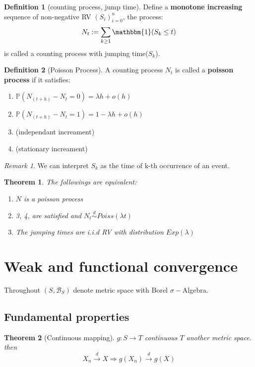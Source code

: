 \documentclass[a4paper,11pt]{book}
\newtheorem{theorem}{Theorem}[section]
\theoremstyle{definition}
\newtheorem{definition}{Definition}[section]
\theoremstyle{remark}
\newtheorem*{remark}{Remark}
\begin{document}
\begin{definition}[counting process, jump time]
	Define a \textbf{monotone increasing} sequence of non-negative RV $(S_i)_{i = 0}^{n}$, the process:
	\begin{equation*}
		N_t: = \sum_{k \geq 1} \mathbbm{1}(S_k \leq t)
	\end{equation*}
	is called a counting process with jumping time($S_k$).
\end{definition}

\begin{definition}[Poisson Process]
A counting process $N_t$ is called a \textbf{poisson process} if it satisfies:
\begin{enumerate}
	\item $\mathbb{P}(N_(t + h) - N_t = 0) = \lambda h + o(h)$
	\item $\mathbb{P}(N_(t + h) - N_t = 1) = 1 - \lambda h + o(h)$
	\item (independant increament)
	\item (stationary increament)
\end{enumerate} 
\end{definition}
\begin{remark}
We can interpret $S_k$ as the time of k-th occurrence of an event. 	
\end{remark}


\begin{theorem}
	The followings are equivalent:
	\begin{enumerate}
		\item $N$ is a poisson process
		\item 3, 4, are satisfied and $N_t \overset{d}{\sim} Poiss(\lambda t)$
		\item The jumping times are i.i.d RV with distribution $Exp(\lambda)$
	\end{enumerate}
\end{theorem}







\section{Weak and functional convergence}
Throughout $(S, \mathcal{B}_S)$ denote metric space with Borel $\sigma-$Algebra.
\subsection{Fundamental properties}
\begin{theorem}[Continuous mapping]
	$g: S \rightarrow T$ continuous $T$ another metric space. then
	\begin{equation*}
		X_n \overset{d}{\rightarrow} X \Rightarrow g(X_n) \overset{d}{\rightarrow}g(X)
	\end{equation*}
\end{theorem}
\end{document}
